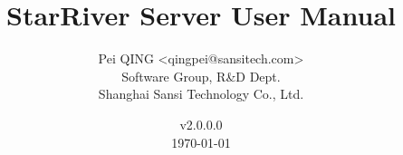 \title{\textbf{StarRiver Server User Manual}}

\author{Pei QING <qingpei@sansitech.com> \\
        Software Group, R\&D Dept.\\
        Shanghai Sansi Technology Co., Ltd.
}

\date{\vspace{3em} v2.0.0.0 \\\vspace{3em} \today}
